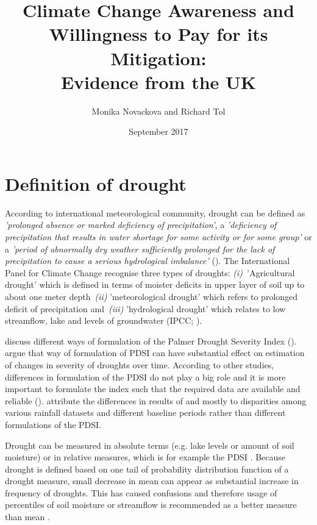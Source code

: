 \documentclass[a4paper,12pt]{article}
\date{\normalsize{September 2017}}
\title{\Large \bf Climate Change Awareness and Willingness to Pay for its Mitigation: \\ Evidence from the UK}
\author{Monika Novackova and Richard Tol}
\affil{\small{Department of Economics, University of Sussex, Falmer, UK}}
\begin{document}
\sloppy
\section*{Definition of drought}
 According to international meteorological community, drought can be defined as \textit{ 'prolonged absence or marked deficiency of precipitation'}, a \textit{'deficiency of precipitation that results in water shortage for some activity or for some group'} or a \textit{'period of abnormally dry weather sufficiently prolonged for the lack of precipitation to cause a serious hydrological imbalance'} (\citealp{IPCCtrenberth, Heim2002}). The International Panel for Climate Change recognise three types of droughts: \textit{(i)}~'Agricultural drought' which is defined in terms of moister deficits in upper layer of soil up to about one meter depth~\textit{(ii)} 'meteorological drought' which refers to prolonged deficit of precipitation and~\textit{(iii)} 'hydrological drought' which relates to low streamflow, lake and levels of groundwater (IPCC; \citealp{IPCCtrenberth, Heim2002}). 
 
 \cite{Trenberth2014} discuss different ways of formulation of the Palmer Drought Severity Index (\citealt{Sheffield2012, Dai2011}).  \cite{Sheffield2012} argue that way of formulation of PDSI can have substantial effect on estimation of changes in severity of droughts over time. According to other studies, differences in formulation of the PDSI do not play a big role and it is more important to formulate the index such that the required data are available and reliable (\citealp{Trenberth2014,vanderSchrier2011,Wang2012}). \cite{Trenberth2014} attribute the differences in results of  \cite{Sheffield2012} and \cite{Trenberth2014} mostly to disparities among various rainfall datasets and different baseline periods rather than different formulations of the PDSI.   

Drought can be measured in absolute terms (e.g. lake levels or amount of soil moisture) or in relative measures, which is for example the  PDSI \citep{Trenberth2014}. Because drought is defined based on one tail of probability distribution function of a drought measure, small decrease in mean can appear as substantial increase in frequency of droughts. This has caused confusions and therefore usage of percentiles of soil moisture or streamflow is recommended as a better measure than mean \citep{Trenberth2014}.



\end{document}
